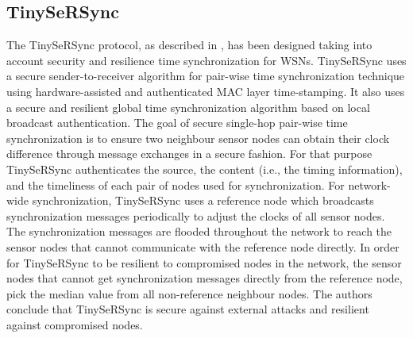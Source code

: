 \subsection{TinySeRSync}
The TinySeRSync protocol, as described in \cite{conf/ccs/SunNW06}, has been designed taking into account security and resilience time synchronization for WSNs. TinySeRSync uses a secure sender-to-receiver algorithm for pair-wise time synchronization technique using hardware-assisted and authenticated MAC layer time-stamping. It also uses a secure and resilient global time synchronization algorithm based on local broadcast authentication. The goal of secure single-hop pair-wise time synchronization is to ensure two neighbour sensor nodes can obtain their clock difference through message exchanges in a secure fashion. For that purpose TinySeRSync authenticates the source, the content (i.e., the timing information), and the timeliness of each pair of nodes used for synchronization. For network-wide synchronization, TinySeRSync uses a reference node which broadcasts synchronization messages periodically to adjust the clocks of all sensor nodes. The synchronization messages are flooded throughout the network to reach the sensor nodes that cannot communicate with the reference node directly. In order for TinySeRSync to be resilient to compromised nodes in the network, the sensor nodes that cannot get synchronization messages directly from the reference node, pick the median value from all non-reference neighbour nodes. The authors conclude that TinySeRSync is secure against external attacks and resilient against compromised nodes.


